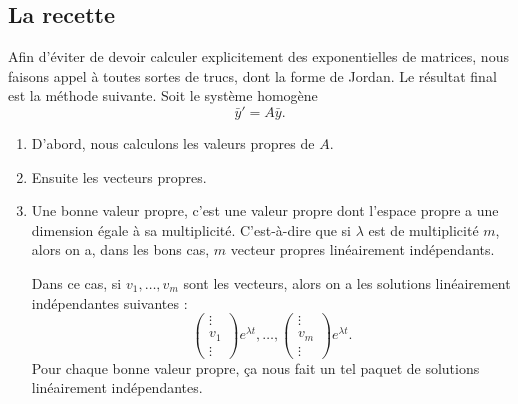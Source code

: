 \subsection{La recette}

Afin d'éviter de devoir calculer explicitement des exponentielles de matrices, nous faisons appel à toutes sortes de trucs, dont la forme de Jordan. Le résultat final est la méthode suivante. Soit le système homogène
\begin{equation}
	\bar y'=A\bar y.
\end{equation}

\let\oldTheEnumi\theenumi
\renewcommand{\theenumi}{\arabic{enumi}.}
\begin{enumerate}

	\item
	      D'abord, nous calculons les valeurs propres de \( A\).

	\item
	      Ensuite les vecteurs propres.

	      \item\label{ItemRapSystDc}
	      Une bonne valeur propre, c'est une valeur propre dont l'espace propre a une dimension égale à sa multiplicité. C'est-à-dire que si \( \lambda\) est de multiplicité \( m\), alors on a, dans les bons cas,  \( m\) vecteur propres linéairement indépendants.

	      Dans ce cas, si \( v_1,\ldots,v_m\) sont les vecteurs, alors on a les solutions linéairement indépendantes suivantes :
	      \begin{equation}
		      \begin{pmatrix}
			      \vdots \\
			      v_1    \\
			      \vdots
		      \end{pmatrix} e^{\lambda t},\ldots,
		      \begin{pmatrix}
			      \vdots \\
			      v_m    \\
			      \vdots
		      \end{pmatrix} e^{\lambda t}.
	      \end{equation}
	      Pour chaque bonne valeur propre, ça nous fait un tel paquet de solutions linéairement indépendantes.


\end{enumerate}
